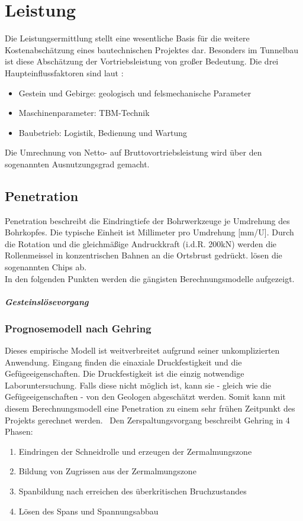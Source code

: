 \chapter{Leistung}
\label{leistung}
Die Leistungsermittlung stellt eine wesentliche Basis für die weitere Kostenabschätzung eines bautechnischen Projektes dar. Besonders im Tunnelbau ist diese Abschätzung der Vortriebsleistung von großer Bedeutung. Die drei Haupteinflussfaktoren sind laut \parencite{thuro2011}:
\begin{itemize}
\item Gestein und Gebirge: geologisch und felsmechanische Parameter
\item Maschinenparameter: TBM-Technik
\item Baubetrieb: Logistik, Bedienung und Wartung
\end{itemize}
Die Umrechnung von Netto- auf Bruttovortriebsleistung wird über den sogenannten Ausnutzungsgrad gemacht.

\section{Penetration}
\label{penetration}
Penetration beschreibt die Eindringtiefe der Bohrwerkzeuge je Umdrehung des Bohrkopfes. Die typische Einheit ist Millimeter pro Umdrehung [mm/U]. 
Durch die Rotation und die gleichmäßige Andruckkraft (i.d.R. 200kN) werden die Rollenmeissel in konzentrischen Bahnen an die Ortsbrust gedrückt. lösen die sogenannten Chips ab.
\\In den folgenden Punkten werden die gängisten Berechnungsmodelle aufgezeigt.
\paragraph{Gesteinslösevorgang} 


\subsection{Prognosemodell nach Gehring}
\label{prognose_gehring}
Dieses empirische Modell ist weitverbreitet aufgrund seiner unkomplizierten Anwendung. Eingang finden die einaxiale Druckfestigkeit und die Gefügeeigenschaften. Die Druckfestigkeit ist die einzig notwendige Laboruntersuchung. Falls diese nicht möglich ist, kann sie - gleich wie die Gefügeeigenschaften - von den Geologen abgeschätzt werden. Somit kann mit diesem Berechnungsmodell eine Penetration zu einem sehr frühen Zeitpunkt des Projekts gerechnet werden.\parencite{leitner2004}
\
Den Zerspaltungsvorgang beschreibt Gehring in 4 Phasen:
\begin{enumerate}
\item[] Eindringen der Schneidrolle und erzeugen der Zermalmungszone
\item[] Bildung von Zugrissen aus der Zermalmungszone
\item[] Spanbildung nach erreichen des überkritischen Bruchzustandes
\item[] Lösen des Spans und Spannungsabbau
\end{enumerate}

